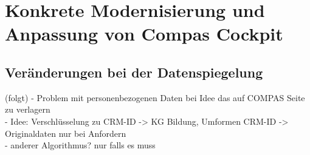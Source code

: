 \documentclass [12pt, a4paper, oneside, titlepage, ngerman]{article}
\begin{document}
\section {Konkrete Modernisierung und Anpassung von Compas Cockpit}

\subsection{Veränderungen bei der Datenspiegelung}
(folgt)
- Problem mit personenbezogenen Daten bei Idee das auf COMPAS Seite zu verlagern\\
- Idee: Verschlüsselung zu CRM-ID -> KG Bildung, Umformen CRM-ID -> Originaldaten nur bei Anfordern\\
- anderer Algorithmus? nur falls es muss
\end{document}
